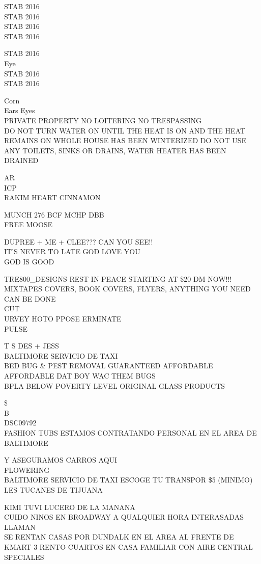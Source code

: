 \documentclass[10pt,letterpaper]{article}
\begin{document}
STAB 2016\\
STAB 2016\\
STAB 2016\\
STAB 2016

STAB 2016\\
Eye\\
STAB 2016\\
STAB 2016

Corn\\
Ears Eyes\\
PRIVATE PROPERTY NO LOITERING NO TRESPASSING\\
DO NOT TURN WATER ON UNTIL THE HEAT IS ON AND THE HEAT REMAINS ON WHOLE HOUSE HAS BEEN WINTERIZED DO NOT USE ANY TOILETS, SINKS OR DRAINS, WATER HEATER HAS BEEN DRAINED

AR\\
ICP\\
RAKIM HEART CINNAMON

MUNCH 276 BCF MCHP DBB\\
FREE MOOSE

DUPREE + ME + CLEE??? CAN YOU SEE!!\\
IT'S NEVER TO LATE GOD LOVE YOU\\
GOD IS GOOD

TRE800\_DESIGNS REST IN PEACE STARTING AT \$20 DM NOW!!! MIXTAPES COVERS, BOOK COVERS, FLYERS, ANYTHING YOU NEED CAN BE DONE\\
CUT\\
URVEY HOTO PPOSE ERMINATE\\
PULSE

T S DES + JESS\\
BALTIMORE SERVICIO DE TAXI\\
BED BUG \& PEST REMOVAL GUARANTEED AFFORDABLE AFFORDABLE DAT BOY WAC THEM BUGS\\
BPLA BELOW POVERTY LEVEL ORIGINAL GLASS PRODUCTS

\$\\
B\\
DSC09792\\
FASHION TUBS ESTAMOS CONTRATANDO PERSONAL EN EL AREA DE BALTIMORE

Y ASEGURAMOS CARROS AQUI\\
FLOWERING\\
BALTIMORE SERVICIO DE TAXI ESCOGE TU TRANSPOR \$5 (MINIMO)\\
LES TUCANES DE TIJUANA

KIMI TUVI LUCERO DE LA MANANA\\
CUIDO NINOS EN BROADWAY A QUALQUIER HORA INTERASADAS LLAMAN\\
SE RENTAN CASAS POR DUNDALK EN EL AREA AL FRENTE DE KMART 3 RENTO CUARTOS EN CASA FAMILIAR CON AIRE CENTRAL\\
SPECIALES
\end{document}
